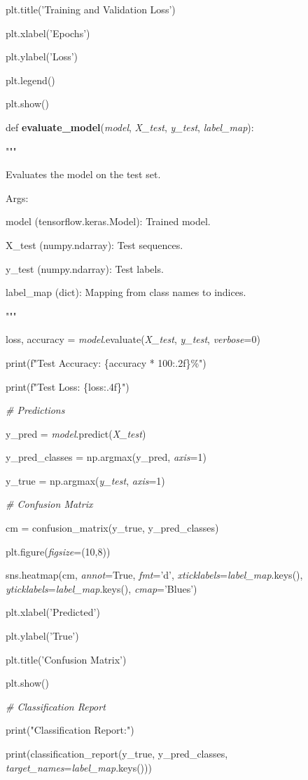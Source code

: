 \documentclass[
]{article}
\begin{document}
plt.title('Training and Validation Loss')

plt.xlabel('Epochs')

plt.ylabel('Loss')

plt.legend()

plt.show()

def \textbf{evaluate\_model}(\emph{model}, \emph{X\_test}, \emph{y\_test}, \emph{label\_map}):

"""

Evaluates the model on the test set.

Args:

model (tensorflow.keras.Model): Trained model.

X\_test (numpy.ndarray): Test sequences.

y\_test (numpy.ndarray): Test labels.

label\_map (dict): Mapping from class names to indices.

"""

loss, accuracy = \emph{model}.evaluate(\emph{X\_test}, \emph{y\_test}, \emph{verbose}=0)

print(f"Test Accuracy: \{accuracy * 100:.2f\}\%")

print(f"Test Loss: \{loss:.4f\}")

\emph{\# Predictions}

y\_pred = \emph{model}.predict(\emph{X\_test})

y\_pred\_classes = np.argmax(y\_pred, \emph{axis}=1)

y\_true = np.argmax(\emph{y\_test}, \emph{axis}=1)

\emph{\# Confusion Matrix}

cm = confusion\_matrix(y\_true, y\_pred\_classes)

plt.figure(\emph{figsize}=(10,8))

sns.heatmap(cm, \emph{annot}=True, \emph{fmt}='d', \emph{xticklabels}=\emph{label\_map}.keys(), \emph{yticklabels}=\emph{label\_map}.keys(), \emph{cmap}='Blues')

plt.xlabel('Predicted')

plt.ylabel('True')

plt.title('Confusion Matrix')

plt.show()

\emph{\# Classification Report}

print("Classification Report:")

print(classification\_report(y\_true, y\_pred\_classes, \emph{target\_names}=\emph{label\_map}.keys()))
\end{document}
